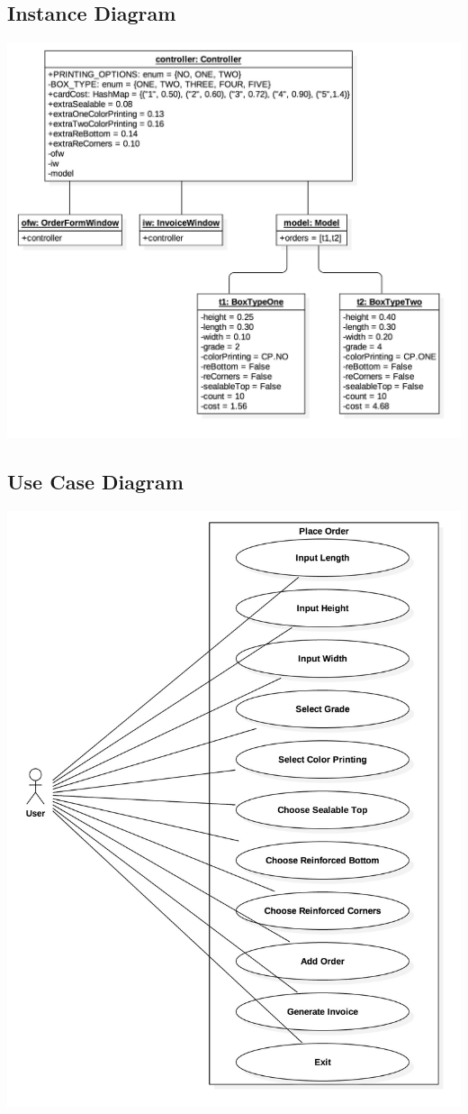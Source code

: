 \documentclass[12pt]{article}
\begin{document}
\subsection{Instance Diagram}
\includegraphics[scale=.3]{./diagrams/InstanceDiagram.jpg}
\subsection{Use Case Diagram}
\includegraphics[scale=.30]{./diagrams/UseCaseDiagram.jpg}
\end{document}
